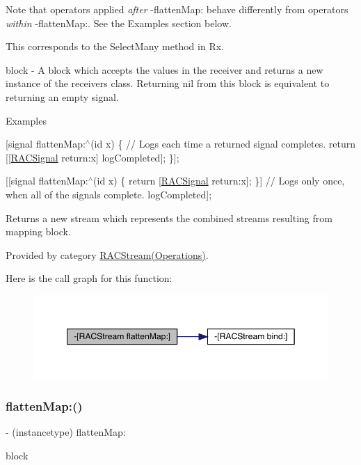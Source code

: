 Note that operators applied {\itshape after} -\/flatten\+Map\+: behave differently from operators {\itshape within} -\/flatten\+Map\+:. See the Examples section below.

This corresponds to the {\ttfamily Select\+Many} method in Rx.

block -\/ A block which accepts the values in the receiver and returns a new instance of the receiver\textquotesingle{}s class. Returning {\ttfamily nil} from this block is equivalent to returning an empty signal.

Examples

\mbox{[}signal flatten\+Map\+:$^\wedge$(id x) \{ // Logs each time a returned signal completes. return \mbox{[}\mbox{[}\mbox{\hyperlink{interface_r_a_c_signal}{R\+A\+C\+Signal}} return\+:x\mbox{]} log\+Completed\mbox{]}; \}\mbox{]};

\mbox{[}\mbox{[}signal flatten\+Map\+:$^\wedge$(id x) \{ return \mbox{[}\mbox{\hyperlink{interface_r_a_c_signal}{R\+A\+C\+Signal}} return\+:x\mbox{]}; \}\mbox{]} // Logs only once, when all of the signals complete. log\+Completed\mbox{]};

Returns a new stream which represents the combined streams resulting from mapping {\ttfamily block}. 

Provided by category \mbox{\hyperlink{category_r_a_c_stream_07_operations_08_a2441b0306adc6ae2845219f8b116119a}{R\+A\+C\+Stream(\+Operations)}}.

Here is the call graph for this function\+:\nopagebreak
\begin{figure}[H]
\begin{center}
\leavevmode
\includegraphics[width=349pt]{interface_r_a_c_stream_a2441b0306adc6ae2845219f8b116119a_cgraph}
\end{center}
\end{figure}
\mbox{\label{interface_r_a_c_stream_a2441b0306adc6ae2845219f8b116119a}} 
\subsubsection{\texorpdfstring{flatten\+Map\+:()}{flattenMap:()}\hspace{0.1cm}{\footnotesize\ttfamily [3/3]}}
{\footnotesize\ttfamily -\/ (instancetype) flatten\+Map\+: \begin{DoxyParamCaption}\item[{(\mbox{\hyperlink{interface_r_a_c_stream}{R\+A\+C\+Stream}} $\ast$($^\wedge$)(id value))}]{block }\end{DoxyParamCaption}}

